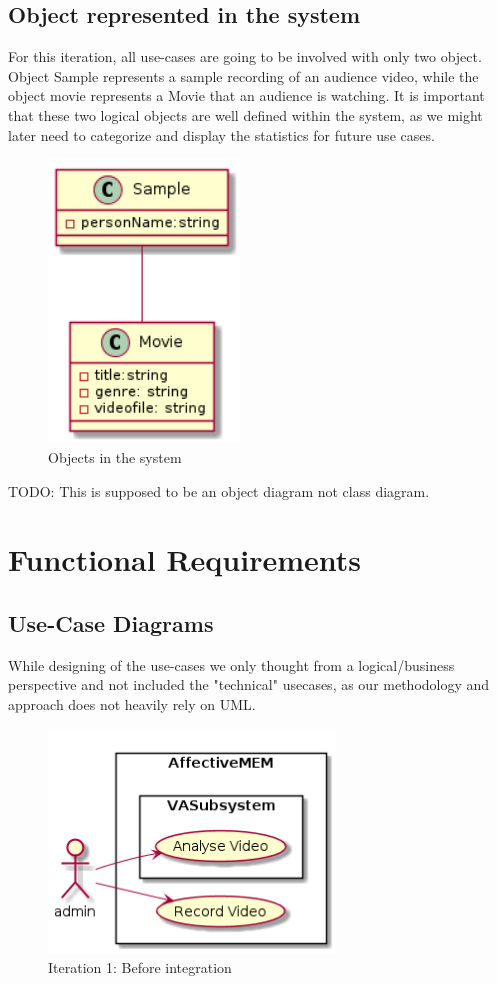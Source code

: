 \documentclass[12pt,a4paper,man]{report}
\begin{document}
\section{Object represented in the system}
\label{sec:org39b1cf3}
For this iteration, all use-cases are going to be involved with only two object. Object Sample represents a sample recording of an audience video, while the object movie represents a Movie that an audience is watching. It is important that these two logical objects are well defined within the system, as we might later need to categorize and display the statistics for future use cases.
\begin{figure}[htbp]
\centering
\includegraphics[width=2in]{./img/obj1.png}
\caption{\label{fig:gantt1}
Objects in the system}
\end{figure}

TODO: This is supposed to be an object diagram not class diagram.

\chapter{Functional Requirements}
\label{sec:org50f6370}
\section{Use-Case Diagrams}
\label{sec:org3bee257}
While designing of the use-cases we only thought from a logical/business perspective and not included the "technical" usecases, as our methodology and approach does not heavily rely on UML. 



\begin{figure}[htbp]
\centering
\includegraphics[width=3in]{./img/auc.png}
\caption{\label{fig:auc}
Iteration 1: Before integration}
\end{figure}
\end{document}
